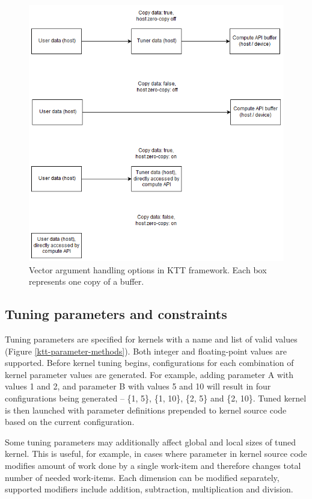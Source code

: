 \documentclass
[
    digital, %
    oneside, %
    table, %
    nolof, %
    nolot, %
    nocover %
]{fithesis3}
\begin{document}
\begin{figure}
\begin{center}
\includegraphics[width=125mm]{resources/ktt_buffer_diagram.png}
\end{center}
\caption{Vector argument handling options in KTT framework. Each box represents one copy of a buffer.}
\label{ktt-buffer-diagram}
\end{figure}

\subsection{Tuning parameters and constraints}
\label{ktt-tuning-parameters}
Tuning parameters are specified for kernels with a name and list of valid values (Figure \ref{ktt-parameter-methods}). Both integer and floating-point
values are supported. Before kernel tuning begins, configurations for each combination of kernel parameter values are generated. For example, adding
parameter A with values 1 and 2, and parameter B with values 5 and 10 will result in four configurations being generated -- \{1, 5\}, \{1, 10\}, \{2, 5\}
and \{2, 10\}. Tuned kernel is then launched with parameter definitions prepended to kernel source code based on the current configuration.

Some tuning parameters may additionally affect global and local sizes of tuned kernel. This is useful, for example, in cases where parameter in kernel
source code modifies amount of work done by a single work-item and therefore changes total number of needed work-items. Each dimension can be modified
separately, supported modifiers include addition, subtraction, multiplication and division.
\end{document}
